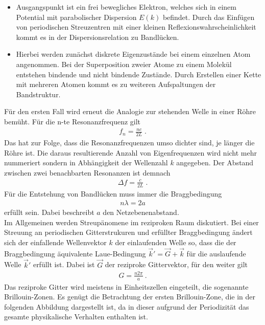 \begin{itemize}
\item Ausgangspunkt ist ein frei bewegliches Elektron, welches sich in einem Potential mit parabolischer Dispersion $E(k)$ befindet. Durch das Einfügen von periodischen Streuzentren mit einer kleinen Reflexionswahrscheinlichkeit kommt es in der Dispersionsrelation zu Bandlücken.
\item Hierbei werden zunächst diskrete Eigenzustände bei einem einzelnen Atom angenommen. Bei der Superposition zweier Atome zu einem Molekül entstehen bindende und nicht bindende Zustände. Durch Erstellen einer Kette mit mehreren Atomen kommt es zu weiteren Aufspaltungen der Bandstruktur.
\end{itemize}

Für den ersten Fall wird erneut die Analogie zur stehenden Welle in einer Röhre bemüht. Für die n-te Resonanzfrequenz gilt
\begin{align}
  f_n = \frac{nc}{2L}\;.
  \label{eq:Resonanz}
\end{align}
Das hat zur Folge, dass die Resonanzfrequenzen umso dichter sind, je länger die Röhre ist. Die daraus resultierende Anzahl von Eigenfrequenzen wird nicht mehr nummeriert sondern in Abhängigkeit der Wellenzahl $k$ angegeben. Der Abstand zwischen zwei benachbarten Resonanzen ist demnach
\begin{align}
  \Delta f = \frac{c}{2L}\;.
  \label{eq:Resonanz2}
\end{align}
Für die Entstehung von Bandlücken muss immer die Braggbedingung
\begin{align}
 n\lambda =2a
 \label{eq:Bragg}
\end{align}
erfüllt sein. Dabei beschreibt $a$ den Netzebenenabstand.\\

Im Allgemeinen werden Streupänomene im reziproken Raum diskutiert. Bei einer Streuung an periodischen Gitterstrukuren und erfüllter Braggbedingung ändert sich der einfallende Wellenvektor $k$ der einlaufenden Welle so, dass die der Braggbedingung äquivalente Laue-Bedingung $\vec{k}' = \vec{G} + \vec{k}$ für die auslaufende Welle $\vec{k}'$ erfüllt ist. Dabei ist $\vec{G}$ der reziproke Gittervektor, für den weiter gilt
\begin{align}
  G=\frac{n2\pi}{a}\:.
  \label{eq:Gittervektor}
\end{align}
Das reziproke Gitter wird meistens in Einheitszellen eingeteilt, die sogenannte Brillouin-Zonen. Es genügt die Betrachtung der ersten Brillouin-Zone, die in der folgenden Abbildung dargestellt ist, da in dieser aufgrund der Periodizität das gesamte physikalische Verhalten enthalten ist.

